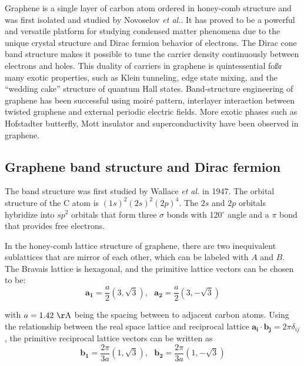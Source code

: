 \documentclass[pdflatex, sectionletters, 12pt]{pittetd}    %
\begin{document}
Graphene is a single layer of carbon atom ordered in honey-comb structure and was first isolated and studied by Novoselov \textit{et al.}\cite{novoselov2004electric}. It has proved to be a powerful and versatile platform for studying condensed matter phenomena due to the unique crystal structure and Dirac fermion behavior of electrons\cite{wilson2006electrons}. The Dirac cone band structure makes it possible to tune the carrier density continuously between electrons and holes. This duality of carriers in graphene is quintessential foßr many exotic properties, such as Klein tunneling\cite{allain2011klein, katsnelson2006chiral, young2009quantum, shytov2008klein}, edge state mixing\cite{williams2007quantum, abanin2007quantized, lohmann2009four, amet2014selective}, and the ``wedding cake'' structure of quantum Hall states\cite{gutierrez2018interaction}. Band-structure engineering of graphene has been successful using moir{\'e} pattern\cite{dean2013hofstadter, hunt2013massive, ponomarenko2013cloing}, interlayer interaction between twisted graphene\cite{cao2018correlated, cao2018unconventional} and external periodic electric fields\cite{forsythe2018band}. More exotic phases such as Hofstadter butterfly\cite{dean2013hofstadter, hunt2013massive, forsythe2018band}, Mott insulator\cite{cao2018correlated} and superconductivity\cite{cao2018unconventional} have been observed in graphene.

\subsection{Graphene band structure and Dirac fermion}

The band structure was first studied by Wallace \textit{et al.} in 1947\cite{wallace1947band}. The orbital structure of the C atom is $(1s)^2(2s)^2(2p)^4$. The $2s$ and $2p$ orbitals hybridize into $sp^2$ orbitals that form three $\sigma$ bonds with 120$^{\circ}$ angle and a $\pi$ bond that provides free electrons. 

In the honey-comb lattice structure of graphene, there are two inequivalent sublattices that are mirror of each other, which can be labeled with $A$ and $B$. The Bravais lattice is hexagonal, and the primitive lattice vectors can be chosen to be: 
$$\mathbf{a_1} = \frac{a}{2}\left(3, \sqrt{3}\right), \ \ \ \mathbf{a_2} = \frac{a}{2}\left(3, -\sqrt{3}\right)$$

with $a = 1.42 \ \mathrm{\AA}$ being the spacing between to adjacent carbon atoms. Using the relationship between the real space lattice and reciprocal lattice $\mathbf{a_i}\cdot\mathbf{b_j} = 2\pi\delta_{ij}$, the primitive reciprocal lattice vectors can be written as 
$$\mathbf{b_1} = \frac{2\pi}{3a}\left(1, \sqrt{3}\right), \ \ \ \mathbf{b_2} = \frac{2\pi}{3a}\left(1, -\sqrt{3}\right)$$
\end{document}
